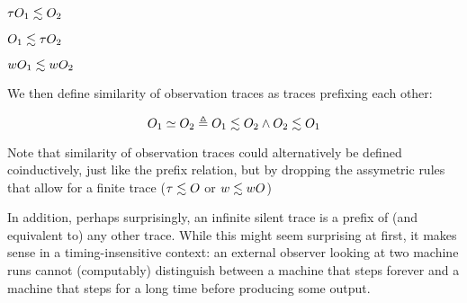\documentclass[acmsmall,review,anonymous]{acmart}\settopmatter{printfolios=true,printccs=false,printacmref=false}
\begin{document}
\begin{minipage}{.3\textwidth}
         {\(\tau O_1 \lesssim O_2\)}
\end{minipage}
\begin{minipage}{.3\textwidth}
         {\(O_1 \lesssim \tau O_2\)}
\end{minipage}
\begin{minipage}{.3\textwidth}
         {\(wO_1 \lesssim wO_2\)}
\end{minipage}

We then define similarity of observation traces as traces prefixing each other:

\[O_1 \simeq O_2 \triangleq O_1 \lesssim O_2 \land O_2 \lesssim O_1\]

 Note that
similarity of observation traces could alternatively be defined coinductively,
just like the prefix relation, but by dropping the assymetric rules that allow
for a finite trace ($\tau \lesssim O$ or $w \lesssim wO$)

In addition, perhaps surprisingly, an infinite silent trace is a
prefix of (and equivalent to) any other trace. While this might seem
surprising at first, it makes sense in a timing-insensitive context:
an external observer looking at two machine runs cannot (computably)
distinguish between a machine that steps forever and a machine that
steps for a long time before producing some output.

%
%
\end{document}
